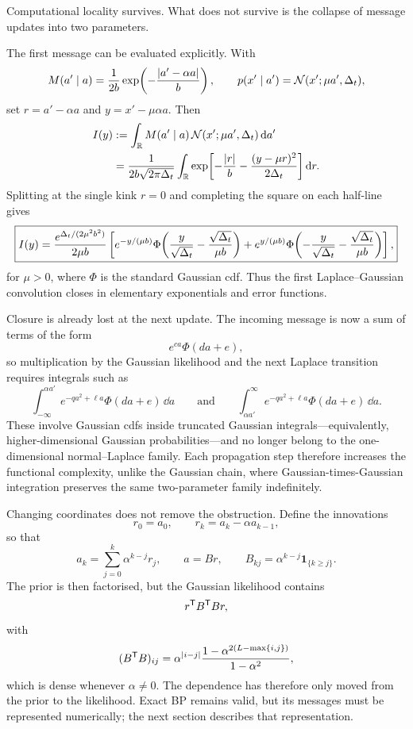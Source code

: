Computational locality survives. What does not survive is the collapse of message updates into two parameters.

\begin{remark}\label{rmk:l-breakdown}
The first message can be evaluated explicitly. With
\[
M(a'\mid a)
=
\frac{1}{2b}
\exp\!\left(-\frac{|a'-\alpha a|}{b}\right),
\qquad
p(x'\mid a')
=
\mathcal{N}(x';\mu a',\Delta_t),
\]
set $r=a'-\alpha a$ and $y=x'-\mu\alpha a$. Then
\begin{align}
I(y)
&:=
\int_{\mathbb{R}} M(a'\mid a)\,
        \mathcal{N}(x';\mu a',\Delta_t)\,\mathrm{d} a' \\
&=
\frac{1}{2b\sqrt{2\pi\Delta_t}}
\int_{\mathbb{R}}
\exp\!\left[
-\frac{|r|}{b}
-\frac{(y-\mu r)^2}{2\Delta_t}
\right]\mathrm{d} r .
\end{align}
Splitting at the single kink $r=0$ and completing the square on each
half-line gives
\begin{equation}
\boxed{
I(y)
=
\frac{e^{\Delta_t/(2\mu^2b^2)}}{2\mu b}
\left[
e^{-y/(\mu b)}
\Phi\!\left(
\frac{y}{\sqrt{\Delta_t}}
-\frac{\sqrt{\Delta_t}}{\mu b}
\right)
+
e^{y/(\mu b)}
\Phi\!\left(
-\frac{y}{\sqrt{\Delta_t}}
-\frac{\sqrt{\Delta_t}}{\mu b}
\right)
\right],
}
\end{equation}
for $\mu>0$, where $\Phi$ is the standard Gaussian cdf. Thus the first
Laplace--Gaussian convolution closes in elementary exponentials and error
functions.

Closure is already lost at the next update. The incoming message is now a
sum of terms of the form
\[
e^{ca}\Phi(da+e),
\]
so multiplication by the Gaussian likelihood and the next Laplace transition
requires integrals such as
\[
\int_{-\infty}^{\alpha a'}
e^{-q a^2+\ell a}\Phi(da+e)\,\dd a
\qquad\text{and}\qquad
\int_{\alpha a'}^\infty
e^{-q a^2+\ell a}\Phi(da+e)\,\dd a .
\]
These involve Gaussian cdfs inside truncated Gaussian integrals---equivalently,
higher-dimensional Gaussian probabilities---and no longer belong to the
one-dimensional normal--Laplace family. Each propagation step therefore
increases the functional complexity, unlike the Gaussian chain, where
Gaussian-times-Gaussian integration preserves the same two-parameter family
indefinitely.

Changing coordinates does not remove the obstruction. Define the innovations
\[
r_0=a_0,
\qquad
r_k=a_k-\alpha a_{k-1},
\]
so that
\[
a_k=\sum_{j=0}^k \alpha^{k-j}r_j,
\qquad a=Br,
\qquad
B_{kj}=\alpha^{k-j}\mathbf 1_{\{k\ge j\}}.
\]
The prior is then factorised, but the Gaussian likelihood contains
\[
r^{\mathsf{T}} B^{\mathsf{T}} B r,
\]
with
\[
(B^{\mathsf{T}} B)_{ij}
=
\alpha^{|i-j|}
\frac{1-\alpha^{2(L-\max\{i,j\})}}
     {1-\alpha^2},
\]
which is dense whenever $\alpha\neq0$. The dependence has therefore only
moved from the prior to the likelihood. Exact BP remains valid, but its
messages must be represented numerically; the next section describes that
representation.
\end{remark}

